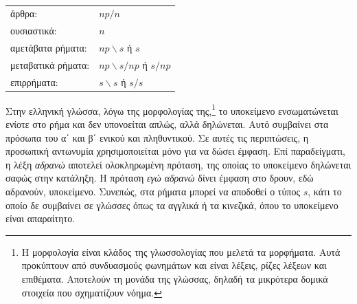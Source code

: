 \documentclass [a4paper,11pt] {book}
\theoremstyle{definition}
\theoremstyle{definition}
\newenvironment{note}[1][Σημείωση]{\begin{trivlist}
\item[\hskip \labelsep {\bfseries #1}]}{\end{trivlist}}
\begin{document}
\paragraph{}
\begin{tabular}{ll}
άρθρα: & $np/n$ \\
ουσιαστικά: & $n$ \\
αμετάβατα ρήματα: & $np\backslash s$ ή $s$ \\
μεταβατικά ρήματα: & $np\backslash s/np$ ή $s/np$ \\
επιρρήματα: & $s\backslash s$ ή $s/s$ \\
\end{tabular}
\begin{note}
Στην ελληνική γλώσσα, λόγω της μορφολογίας της,\footnote{Η μορφολογία είναι κλάδος της γλωσσολογίας που μελετά τα μορφήματα. Αυτά προκύπτουν από συνδυασμούς φωνημάτων και είναι λέξεις, ρίζες λέξεων και επιθέματα. Αποτελούν τη μονάδα της γλώσσας, δηλαδή τα μικρότερα δομικά στοιχεία που σχηματίζουν νόημα.} το υποκείμενο ενσωματώνεται ενίοτε στο ρήμα και δεν υπονοείται απλώς, αλλά δηλώνεται. Αυτό συμβαίνει στα πρόσωπα του α΄ και β΄ ενικού και πληθυντικού. Σε αυτές τις περιπτώσεις, η προσωπική αντωνυμία χρησιμοποιείται μόνο για να δώσει έμφαση. Επί παραδείγματι, η λέξη \textit{αδρανώ} αποτελεί ολοκληρωμένη πρόταση, της οποίας το υποκείμενο δηλώνεται σαφώς στην κατάληξη. Η πρόταση \textit{εγώ αδρανώ} δίνει έμφαση στο δρουν, εδώ αδρανούν, υποκείμενο. Συνεπώς, στα ρήματα μπορεί να αποδοθεί ο τύπος $s$, κάτι το οποίο δε συμβαίνει σε γλώσσες όπως τα αγγλικά ή τα κινεζικά, όπου το υποκείμενο είναι απαραίτητο.
\end{note}
\end{document}
